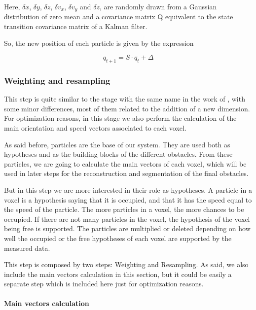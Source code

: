 Here, $\delta x$, $\delta y$, $\delta z$, $\delta v_x$, $\delta v_y$ and $\delta z$, are randomly drawn from a Gaussian distribution of zero mean and a covariance matrix Q equivalent to the state transition covariance matrix of a Kalman filter.

So, the new position of each particle is given by the expression

\begin{equation}\label{eq:cp05_particle_update}
q_{t + 1} = S \cdot q_{t} + \Delta
\end{equation}

\subsubsection{Weighting and resampling}\label{ch:chapter05_01_04_02}

This step is quite similar to the stage with the same name in the work of \cite{danescu2012particle}, with some minor differences, most of them related to the addition of a new dimension. For optimization reasons, in this stage we also perform the calculation of the main orientation and speed vectors associated to each voxel.

As said before, particles are the base of our system. They are used both as hypotheses and as the building blocks of the different obstacles. From these particles, we are going to calculate the main vectors of each voxel, which will be used in later steps for the reconstruction and segmentation of the final obstacles.

But in this step we are more interested in their role as hypotheses. A particle in a voxel is a hypothesis saying that it is occupied, and that it has the speed equal to the speed of the particle. The more particles in a voxel, the more chances to be occupied. If there are not many particles in the voxel, the hypothesis of the voxel being free is supported. The particles are multiplied or deleted depending on how well the occupied or the free hypotheses of each voxel are supported by the measured data.

This step is composed by two steps: Weighting and Resampling. As said, we also include the main vectors calculation in this section, but it could be easily a separate step which is included here just for optimization reasons.

\paragraph{Main vectors calculation}\label{ch:chapter05_01_04_02_01}

